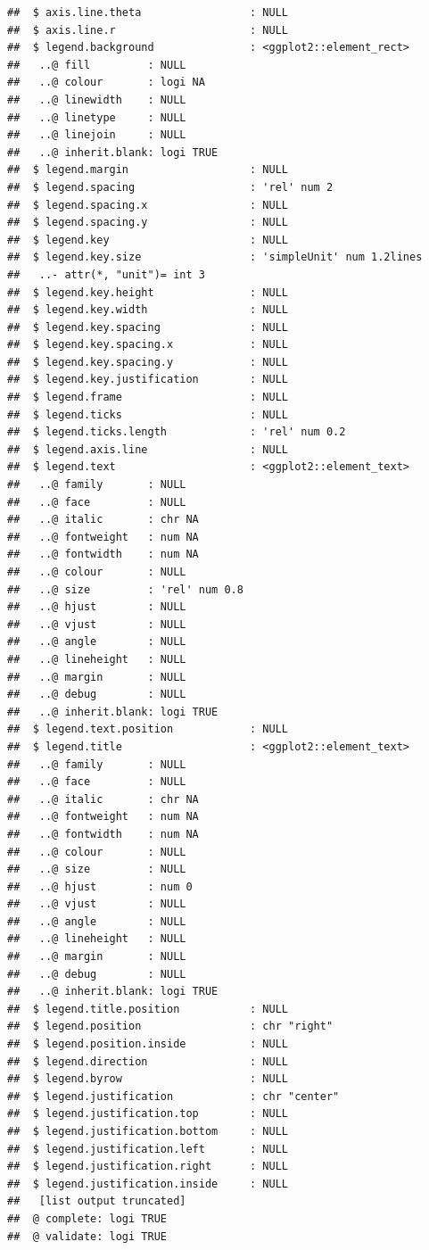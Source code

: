 \documentclass[
]{article}
\begin{document}
\begin{verbatim}
##  $ axis.line.theta                 : NULL
##  $ axis.line.r                     : NULL
##  $ legend.background               : <ggplot2::element_rect>
##   ..@ fill         : NULL
##   ..@ colour       : logi NA
##   ..@ linewidth    : NULL
##   ..@ linetype     : NULL
##   ..@ linejoin     : NULL
##   ..@ inherit.blank: logi TRUE
##  $ legend.margin                   : NULL
##  $ legend.spacing                  : 'rel' num 2
##  $ legend.spacing.x                : NULL
##  $ legend.spacing.y                : NULL
##  $ legend.key                      : NULL
##  $ legend.key.size                 : 'simpleUnit' num 1.2lines
##   ..- attr(*, "unit")= int 3
##  $ legend.key.height               : NULL
##  $ legend.key.width                : NULL
##  $ legend.key.spacing              : NULL
##  $ legend.key.spacing.x            : NULL
##  $ legend.key.spacing.y            : NULL
##  $ legend.key.justification        : NULL
##  $ legend.frame                    : NULL
##  $ legend.ticks                    : NULL
##  $ legend.ticks.length             : 'rel' num 0.2
##  $ legend.axis.line                : NULL
##  $ legend.text                     : <ggplot2::element_text>
##   ..@ family       : NULL
##   ..@ face         : NULL
##   ..@ italic       : chr NA
##   ..@ fontweight   : num NA
##   ..@ fontwidth    : num NA
##   ..@ colour       : NULL
##   ..@ size         : 'rel' num 0.8
##   ..@ hjust        : NULL
##   ..@ vjust        : NULL
##   ..@ angle        : NULL
##   ..@ lineheight   : NULL
##   ..@ margin       : NULL
##   ..@ debug        : NULL
##   ..@ inherit.blank: logi TRUE
##  $ legend.text.position            : NULL
##  $ legend.title                    : <ggplot2::element_text>
##   ..@ family       : NULL
##   ..@ face         : NULL
##   ..@ italic       : chr NA
##   ..@ fontweight   : num NA
##   ..@ fontwidth    : num NA
##   ..@ colour       : NULL
##   ..@ size         : NULL
##   ..@ hjust        : num 0
##   ..@ vjust        : NULL
##   ..@ angle        : NULL
##   ..@ lineheight   : NULL
##   ..@ margin       : NULL
##   ..@ debug        : NULL
##   ..@ inherit.blank: logi TRUE
##  $ legend.title.position           : NULL
##  $ legend.position                 : chr "right"
##  $ legend.position.inside          : NULL
##  $ legend.direction                : NULL
##  $ legend.byrow                    : NULL
##  $ legend.justification            : chr "center"
##  $ legend.justification.top        : NULL
##  $ legend.justification.bottom     : NULL
##  $ legend.justification.left       : NULL
##  $ legend.justification.right      : NULL
##  $ legend.justification.inside     : NULL
##   [list output truncated]
##  @ complete: logi TRUE
##  @ validate: logi TRUE
\end{verbatim}
\end{document}
